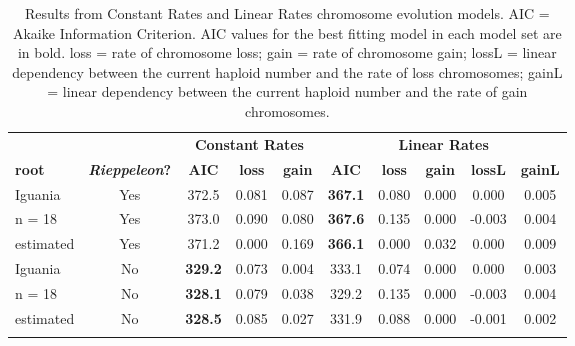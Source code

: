 \begin{longtable}{lccccccccc}

\caption{Results from Constant Rates and Linear Rates chromosome evolution models. AIC = Akaike Information Criterion. AIC values for the best fitting model in each model set are in bold. loss = rate of chromosome loss; gain = rate of chromosome gain; lossL = linear dependency between the current haploid number and the rate of loss chromosomes; gainL = linear dependency between the current haploid number and the rate of gain chromosomes.}\\ 
  
\hline
 &  & \multicolumn{3}{c}{\textbf{Constant Rates}} & \multicolumn{5}{c}{\textbf{Linear Rates}} \\
\textbf{root} & \textbf{\textit{Rieppeleon}?} & 
\textbf{AIC} & \textbf{loss} & \textbf{gain} & 
\textbf{AIC} & \textbf{loss} & \textbf{gain} & \textbf{lossL} & \textbf{gainL} \\
\hline
Iguania  &
Yes &
372.5 &
0.081 &
0.087 &
\textbf{367.1} &
0.080 &
0.000 &
0.000 &
0.005 \\
n = 18  &
Yes &
373.0 &
0.090 &
0.080 &
\textbf{367.6} &
0.135 &
0.000 &
-0.003 &
0.004 \\
estimated &
Yes &
371.2 &
0.000 &
0.169 &
\textbf{366.1} &
0.000 &
0.032 &
0.000 &
0.009 \\
Iguania &
No &
\textbf{329.2} &
0.073 &
0.004 &
333.1 &
0.074 &
0.000 &
0.000 &
0.003 \\
n = 18 &
No &
\textbf{328.1} &
0.079 &
0.038 &
329.2 &
0.135 &
0.000 &
-0.003 &
0.004 \\
estimated &
No &
\textbf{328.5} &
0.085 &
0.027 &
331.9 &
0.088 &
0.000 &
-0.001 &
0.002\\
\hline

\label{table-otus}
\end{longtable}
